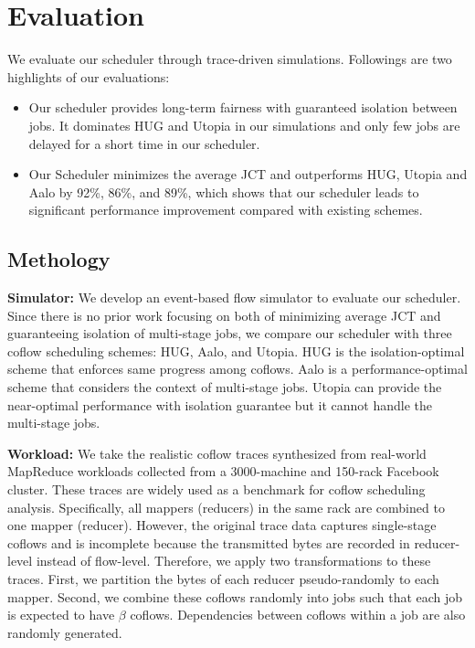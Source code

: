 \documentclass[10pt,journal,compsoc]{IEEEtran}
\begin{document}
\section{Evaluation}
We evaluate our scheduler through trace-driven simulations.
%
Followings are two highlights of our evaluations:%

\begin{itemize}
	\item Our scheduler provides long-term fairness with guaranteed isolation between jobs. It dominates HUG\cite{HUG} and Utopia\cite{utopia} in our simulations and only few jobs are delayed for a short time in our scheduler.
	\item Our Scheduler minimizes the average JCT and outperforms HUG, Utopia and Aalo by 92\%, 86\%, and 89\%, which shows that our scheduler leads to significant performance improvement compared with existing schemes.
\end{itemize}

\subsection{Methology}\label{evaluation}
\noindent\textbf{Simulator:} We develop an event-based flow simulator to evaluate our scheduler.
%
Since there is no prior work focusing on both of minimizing average JCT and guaranteeing isolation of multi-stage jobs,
%
we compare our scheduler with three coflow scheduling schemes: HUG\cite{HUG}, Aalo\cite{aalo}, and Utopia\cite{utopia}.
%
HUG is the isolation-optimal scheme that enforces same progress among coflows.
%
Aalo is a performance-optimal scheme that considers the context of multi-stage jobs.
%
Utopia can provide the near-optimal performance with isolation guarantee but it cannot handle the multi-stage jobs.

\noindent\textbf{Workload:} We take the realistic coflow traces\cite{benchmark} synthesized from real-world MapReduce workloads collected from a 3000-machine and 150-rack Facebook cluster.
%
These traces are widely used as a benchmark for coflow scheduling analysis\cite{varys,aalo,minimizing,fair}.
%
Specifically, all mappers (reducers) in the same rack are combined to one mapper (reducer).
%
However, the original trace data captures single-stage coflows and is incomplete because the transmitted bytes are recorded in reducer-level instead of flow-level.
%
Therefore, we apply two transformations to these traces.
%
First, we partition the bytes of each reducer pseudo-randomly to each mapper.
%
Second, we combine these coflows randomly into jobs such that each job is expected to have $\beta$ coflows.
%
Dependencies between coflows within a job are also randomly generated.
\end{document}
